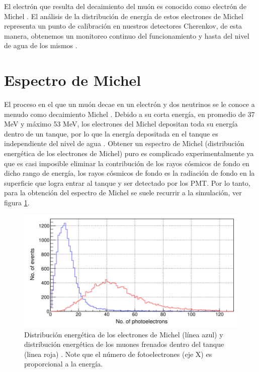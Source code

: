 	El electrón que resulta del decaimiento del muón es conocido como electrón de Michel \cite{michel}. El análisis de la distribución de energía de estos electrones de Michel representa un punto de calibración en nuestros detectores Cherenkov, de esta manera, obtenemos un monitoreo continuo del funcionamiento y hasta del nivel de agua de los mismos \cite{ZUO20181}.

\section{Espectro de Michel}\label{ESPECTRO_MICHEL}
	El proceso en el que un muón decae en un electrón y dos neutrinos se le conoce a menudo como decaimiento Michel \cite{RENGA2019100029}. Debido a su corta energía, en promedio de 37 MeV y máximo 53 MeV, los electrones del Michel depositan toda su energía dentro de un tanque, por lo que la energía depositada en el tanque es independiente del nivel de agua \cite{ZUO20181}. Obtener un espectro de Michel (distribución energética de los electrones de Michel) puro es complicado experimentalmente ya que es casi imposible eliminar la contribución de los rayos cósmicos de fondo en dicho rango de energía, los rayos cósmicos de fondo es la radiación de fondo en la superficie que logra entrar al tanque y ser detectado por los PMT. Por lo tanto, para la obtención del espectro de Michel se suele recurrir a la simulación, ver figura \ref{MICHEL_ESPECTRO_SIMULADO}.
	
	\begin{figure}[h]
		\centering
		\includegraphics[scale = 0.45]{FIGURAS/ESPECTRO_MICHEL_SIMULADO.png}
		\caption{Distribución energética de los electrones de Michel (línea azul) y distribución energética de los muones frenados dentro del tanque (linea roja) \cite{ZUO20181}. Note que el número de fotoelectrones (eje X) es proporcional a la energía.}
		\label{MICHEL_ESPECTRO_SIMULADO}
	\end{figure}